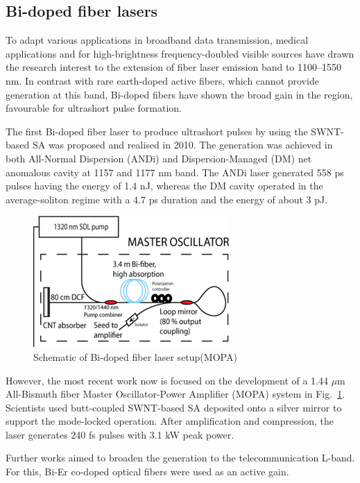\documentclass{phyasgn}\usepackage{nag}
\newcommand{\figref}[1]{Fig.~\ref{#1}}
\begin{document}
\subsection{Bi-doped fiber lasers}
To adapt various applications in broadband data transmission, medical applications and for high-brightness frequency-doubled visible sources have drawn the research interest to the extension of fiber laser emission band to 1100–1550 nm. In contrast with rare earth-doped active fibers, which cannot provide generation at this band, Bi-doped fibers have shown the broad gain in the region, favourable for ultrashort pulse formation. 
\par The first Bi-doped fiber laser to produce ultrashort pulses by using the SWNT-based SA was proposed and realised in 2010\cite{kelleher2010bismuth}. The generation was achieved in both All-Normal Dispersion (ANDi) and Dispersion-Managed (DM) net anomalous cavity at 1157 and 1177 nm band. The ANDi laser generated 558 ps pulses having the energy of 1.4 nJ, whereas the DM cavity operated in the average-soliton regime with a 4.7 ps duration and the energy of about 3 pJ.
\begin{figure}[!h]
	\centering
	\includegraphics[width=.75\linewidth]{pic/14.png}
	\caption[Band structures]{Schematic of Bi-doped fiber laser setup(MOPA)\cite{noronen2015all}}
	\label{14}
	\end{figure}
\par However, the most recent work now is focused on the development of a 1.44 $\mu$m All-Bismuth fiber Master Oscillator-Power Amplifier (MOPA) system in \figref{14}. Scientists used butt-coupled SWNT-based SA deposited onto a silver mirror to support the mode-locked operation. After amplification and compression, the laser generates 240 fs pulses with 3.1 kW peak power\cite{noronen2015all}.
\par Further works aimed to broaden the generation to the telecommunication L-band. For this, Bi-Er co-doped optical fibers were used as an active gain\cite{ahmad2014mode}. 
\end{document}
